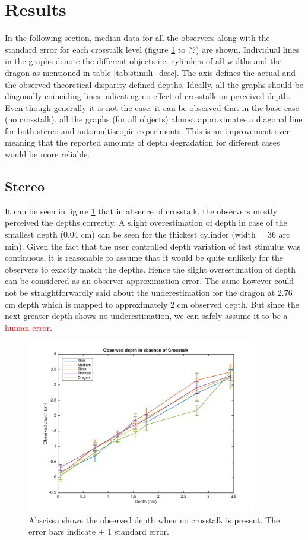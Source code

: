 \section{Results}

In the following section, median data for all the observers along with the standard error for each crosstalk level (figure \ref{fig:s_crosstalk_0} to ??) are shown. Individual lines in the graphs denote the different objects i.e. cylinders of all widths and the dragon as mentioned in table \ref{tab:stimili_desc}. The axis defines the actual and the observed theoretical disparity-defined depths. Ideally, all the graphs should be diagonally coinciding lines indicating no effect of crosstalk on perceived depth. Even though generally it is not the case, it can be observed that in the base case (no crosstalk), all the graphs (for all objects) almost approximates a diagonal line for both stereo and automultiscopic experiments. This is an improvement over \cite{tsirlin2012effect} meaning that the reported amounts of depth degradation for different cases would be more reliable.

\subsection{Stereo}
It can be seen in figure \ref{fig:s_crosstalk_0} that in absence of crosstalk, the observers mostly perceived the depths correctly. A slight overestimation of depth in case of the smallest depth (0.04 cm) can be seen for the thickest cylinder (width = 36 arc min). Given the fact that the user controlled depth variation of test stimulus was continuous, it is reasonable to assume that it would be quite unlikely for the observers to exactly match the depths. Hence the slight overestimation of depth can be considered as an observer approximation error. The same however could not be straightforwardly said about the underestimation for the dragon at 2.76 cm depth which is mapped to approximately 2 cm observed depth. But since the next greater depth shows no underestimation, we can safely assume it to be a \textcolor{red}{human error}.
\begin{figure}[H]
\centering
    \includegraphics[width=0.9\textwidth]{./Template_Figures/s_crosstalk_0}
    \caption{Abscissa shows the observed depth when no crosstalk is present. The error bars indicate $\pm$ 1 standard error.\label{fig:s_crosstalk_0}}
\end{figure}

